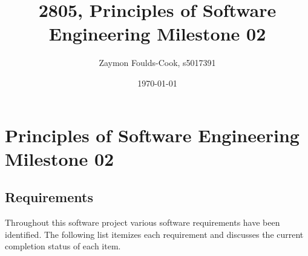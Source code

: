 \documentclass[12pt, a4]{report}
\title{2805, Principles of Software Engineering Milestone 02}
\author{Zaymon Foulds-Cook, s5017391}%
\date{\today}
\begin{document}
\begin{titlepage}
	\maketitle
\end{titlepage}

\tableofcontents
\pagebreak

%
%
\section{Principles of Software Engineering Milestone 02}
\subsection{Requirements}
\par Throughout this software project various software requirements have been identified. The following list itemizes each requirement and discusses the current completion status of each item.
\end{document}
